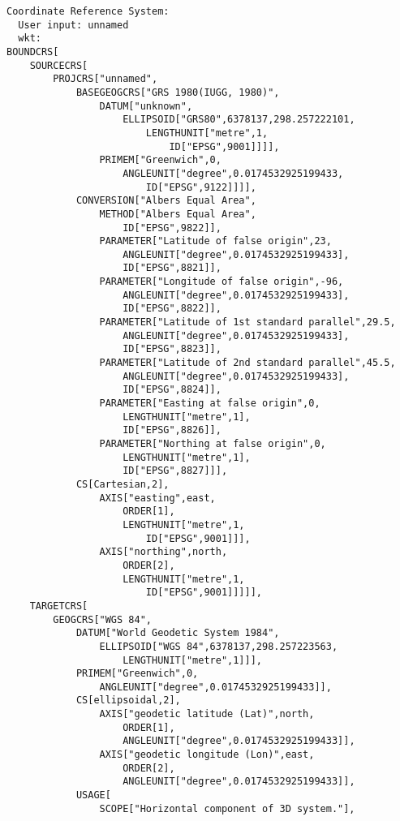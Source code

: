 \documentclass[
  letterpaper,
]{book}
\begin{document}
\begin{verbatim}
Coordinate Reference System:
  User input: unnamed 
  wkt:
BOUNDCRS[
    SOURCECRS[
        PROJCRS["unnamed",
            BASEGEOGCRS["GRS 1980(IUGG, 1980)",
                DATUM["unknown",
                    ELLIPSOID["GRS80",6378137,298.257222101,
                        LENGTHUNIT["metre",1,
                            ID["EPSG",9001]]]],
                PRIMEM["Greenwich",0,
                    ANGLEUNIT["degree",0.0174532925199433,
                        ID["EPSG",9122]]]],
            CONVERSION["Albers Equal Area",
                METHOD["Albers Equal Area",
                    ID["EPSG",9822]],
                PARAMETER["Latitude of false origin",23,
                    ANGLEUNIT["degree",0.0174532925199433],
                    ID["EPSG",8821]],
                PARAMETER["Longitude of false origin",-96,
                    ANGLEUNIT["degree",0.0174532925199433],
                    ID["EPSG",8822]],
                PARAMETER["Latitude of 1st standard parallel",29.5,
                    ANGLEUNIT["degree",0.0174532925199433],
                    ID["EPSG",8823]],
                PARAMETER["Latitude of 2nd standard parallel",45.5,
                    ANGLEUNIT["degree",0.0174532925199433],
                    ID["EPSG",8824]],
                PARAMETER["Easting at false origin",0,
                    LENGTHUNIT["metre",1],
                    ID["EPSG",8826]],
                PARAMETER["Northing at false origin",0,
                    LENGTHUNIT["metre",1],
                    ID["EPSG",8827]]],
            CS[Cartesian,2],
                AXIS["easting",east,
                    ORDER[1],
                    LENGTHUNIT["metre",1,
                        ID["EPSG",9001]]],
                AXIS["northing",north,
                    ORDER[2],
                    LENGTHUNIT["metre",1,
                        ID["EPSG",9001]]]]],
    TARGETCRS[
        GEOGCRS["WGS 84",
            DATUM["World Geodetic System 1984",
                ELLIPSOID["WGS 84",6378137,298.257223563,
                    LENGTHUNIT["metre",1]]],
            PRIMEM["Greenwich",0,
                ANGLEUNIT["degree",0.0174532925199433]],
            CS[ellipsoidal,2],
                AXIS["geodetic latitude (Lat)",north,
                    ORDER[1],
                    ANGLEUNIT["degree",0.0174532925199433]],
                AXIS["geodetic longitude (Lon)",east,
                    ORDER[2],
                    ANGLEUNIT["degree",0.0174532925199433]],
            USAGE[
                SCOPE["Horizontal component of 3D system."],

\end{verbatim}
\end{document}
